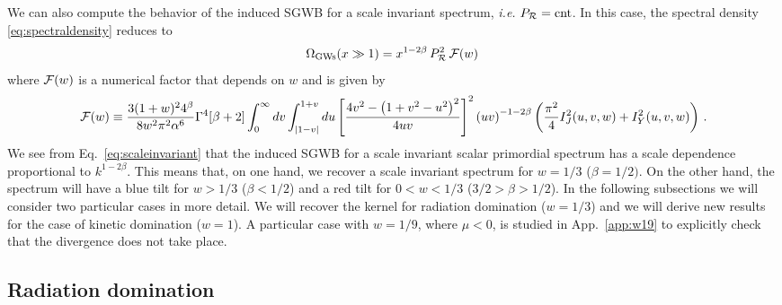 \documentclass[aps,10pt,prd,groupedaddress,nofootinbib,notitlepage,eqsecnum,preprintnumbers]{revtex4-1}
\begin{document}
We can also compute the behavior of the induced SGWB for a scale invariant spectrum, \textit{i.e.} $P_{\cal R}={\rm cnt}$. In this case, the spectral density \eqref{eq:spectraldensity} reduces to
\begin{align}\label{eq:scaleinvariant}
\Omega_{\rm GWs}(x\gg1)=x^{1-2\beta}\,P_{\cal R}^2\,{\cal F}(w)\,
\end{align}
where ${\cal F}(w)$ is a numerical factor that depends on $w$ and is given by
\begin{align}
{\cal F}(w)\equiv\frac{3(1+w)^2 4^\beta}{8w^2\pi^2\alpha^6}\Gamma^4[\beta+2]\int_0^\infty dv \int_{|1-v|}^{1+v} du\left[\frac{4v^2-\left(1+v^2-u^2\right)^2}{4uv}\right]^2 \left(uv\right)^{-1-2\beta}\left(\frac{\pi^2}{4}{I}^2_J(u,v,w)+{I}^2_Y(u,v,w)\right)\,.
\end{align}
We see from Eq.~\eqref{eq:scaleinvariant} that the induced SGWB for a scale invariant scalar primordial spectrum has a scale dependence proportional to $k^{1-2\beta}$. This means that, on one hand, we recover a scale invariant spectrum for $w=1/3$ ($\beta=1/2)$. On the other hand, the spectrum will have a blue tilt for $w>1/3$ ($\beta<1/2$) and a red tilt for $0<w<1/3$ ($3/2>\beta>1/2$). In the following subsections we will consider two particular cases in more detail. We will recover the kernel for radiation domination ($w=1/3$) and we will derive new results for the case of kinetic domination ($w=1$). A particular case with $w=1/9$, where $\mu<0$, is studied in App.~\ref{app:w19} to explicitly check that the divergence does not take place.


\subsection{Radiation domination\label{subsec:RD}}
\end{document}
